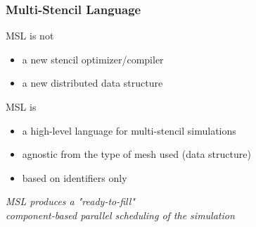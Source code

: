 \documentclass{beamer}
\begin{document}

\begin{frame}
\frametitle{Multi-Stencil Language}
\begin{alertblock}{MSL is not}
\begin{itemize}
\item a new stencil optimizer/compiler
\item a new distributed data structure
\end{itemize}
\end{alertblock}
\begin{block}{MSL is}
\begin{itemize}
\item a high-level language for multi-stencil simulations
\item agnostic from the type of mesh used (data structure)
\item based on identifiers only
\end{itemize}
\end{block}
\begin{center}
\textit{MSL produces a "ready-to-fill"\\component-based parallel scheduling of the simulation}
\end{center}
\end{frame}
\end{document}
